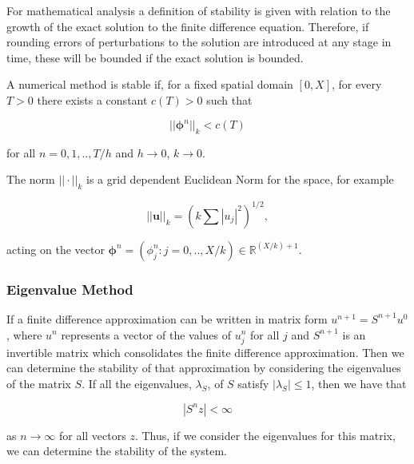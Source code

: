 \documentclass[../main.tex]{subfiles}
\begin{document}
  For mathematical analysis a definition of stability is given with relation to the growth of the exact solution to the finite difference equation. Therefore, if rounding errors of perturbations to the solution are introduced at any stage in time, these will be bounded if the exact solution is bounded.

  \begin{definition}
    A numerical method is stable if, for a fixed spatial domain $[0, X]$, for every $T > 0$ there exists a constant $c(T) > 0$ such that

    \begin{equation}
      || \boldsymbol\phi^n ||_k < c(T)
    \end{equation}

    for all $n = 0, 1, .. , T / h$ and $h \to 0$, $k \to 0$.
  \end{definition}

  The norm $|| \cdot ||_k$ is a grid dependent Euclidean Norm for the space, for example

  $$
    || \mathbf{u} ||_k = \left( k \sum |u_j|^2 \right)^{1/2},
  $$

  acting on the vector $\boldsymbol\phi^n = (\phi^n_j : j = 0, .. , X / k) \in \mathbb{R}^{(X / k) + 1}$.

  \subsubsection{Eigenvalue Method}
  If a finite difference approximation can be written in matrix form $u^{n+1} = S^{n+1} u^0$, where $u^n$ represents a vector of the values of $u^n_j$ for all $j$ and $S^{n+1}$ is an invertible matrix which consolidates the finite difference approximation. Then we can determine the stability of that approximation by considering the eigenvalues of the matrix $S$. If all the eigenvalues, $\lambda_S$, of $S$ satisfy $| \lambda_S | \leq 1$, then we have that

  \begin{equation}
    |S^n z | < \infty
  \end{equation}

  as $n \to \infty$ for all vectors $z$. Thus, if we consider the eigenvalues for this matrix, we can determine the stability of the system.
\end{document}
